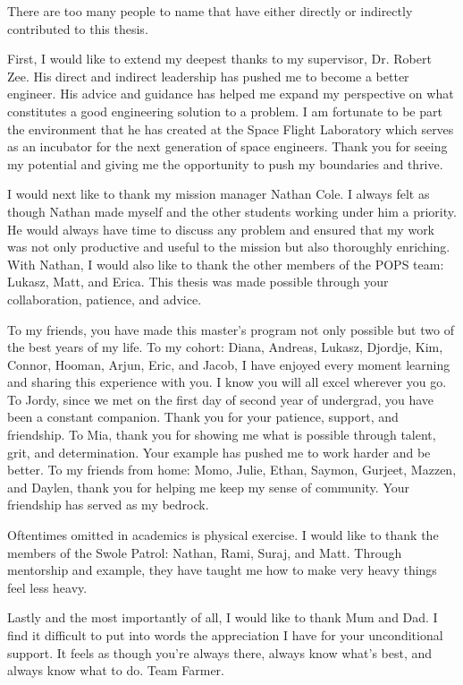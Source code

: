 There are too many people to name that have either directly or indirectly
contributed to this thesis. 

First, I would like to extend my deepest thanks to my supervisor, Dr. Robert
Zee. His direct and indirect leadership has pushed me to become a better
engineer. His advice and guidance has helped me expand my perspective on what
constitutes a good engineering solution to a problem. I am fortunate to be part
the environment that he has created at the Space Flight Laboratory which serves
as an incubator for the next generation of space engineers.  Thank you for
seeing my potential and giving me the opportunity to push my boundaries and
thrive.

I would next like to thank my mission manager Nathan Cole. I always felt as
though Nathan made myself and the other students working under him a priority.
He would always have time to discuss any problem and ensured that my work was
not only productive and useful to the mission but also thoroughly enriching.
With Nathan, I would also like to thank the other members of the POPS team:
Lukasz, Matt, and Erica. This thesis was made possible through your
collaboration, patience, and advice.  

To my friends, you have made this master's program not only possible but two of
the best years of my life. To my cohort: Diana, Andreas, Lukasz, Djordje, Kim,
Connor, Hooman, Arjun, Eric, and Jacob, I have enjoyed every moment learning
and sharing this experience with you. I know you will all excel wherever you
go. To Jordy, since we met on the first day of second year of undergrad, you
have been a constant companion. Thank you for your patience, support, and
friendship. To Mia, thank you for showing me what is possible through talent,
grit, and determination. Your example has pushed me to work harder and be
better.  To my friends from home: Momo, Julie, Ethan, Saymon, Gurjeet, Mazzen,
and Daylen, thank you for helping me keep my sense of community. Your
friendship has served as my bedrock. 

Oftentimes omitted in academics is physical exercise. I would like to thank the
members of the Swole Patrol: Nathan, Rami, Suraj, and Matt. Through mentorship
and example, they have taught me how to make very heavy things feel less heavy.

Lastly and the most importantly of all, I would like to thank Mum and Dad. I
find it difficult to put into words the appreciation I have for your
unconditional support. It feels as though you're always there, always know
what's best, and always know what to do. Team Farmer.

